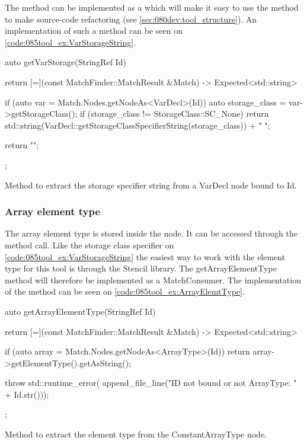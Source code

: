 The  method can be implemented as a  which will make it easy to use the method to make source-code refactoring (see \cref{sec:080dev:tool_structure}). An implementation of such a method can be seen on \cref{code:085tool_ex:VarStorageString}.

\begin{listing}[H]
    \begin{cppcode}
auto getVarStorage(StringRef Id) {
    return [=](const MatchFinder::MatchResult &Match) -> Expected<std::string> {
        if (auto var = Match.Nodes.getNodeAs<VarDecl>(Id)) {
            auto storage_class = var->getStorageClass();
            if (storage_class != StorageClass::SC_None) {
               return std::string(VarDecl::getStorageClassSpecifierString(storage_class)) + " ";
            }
        }

        return "";
    };
}
    \end{cppcode}
    \caption{Method to extract the storage specifier string from a VarDecl node bound to Id.}
    \label{code:085tool_ex:VarStorageString}
\end{listing}

\subsubsection*{Array element type}

The array element type is stored inside the  node. It can be accessed through the  method call. Like the storage class specifier on \cref{code:085tool_ex:VarStorageString} the easiest way to work with the element type for this tool is through the Stencil library. The getArrayElementType method will therefore be implemented as a MatchConsumer. The implementation of the method can be seen on \cref{code:085tool_ex:ArrayElemtType}. 

\begin{listing}[H]
    \begin{cppcode}
auto getArrayElementType(StringRef Id) {
    return [=](const MatchFinder::MatchResult &Match) -> Expected<std::string> {
        if (auto array = Match.Nodes.getNodeAs<ArrayType>(Id)) {
            return array->getElementType().getAsString();
        }

        throw std::runtime_error(
			    append_file_line("ID not bound or not ArrayType: " + Id.str()));
    };
}
    \end{cppcode}
    \caption{Method to extract the element type from the ConstantArrayType node.}
    \label{code:085tool_ex:ArrayElemtType}
\end{listing}

